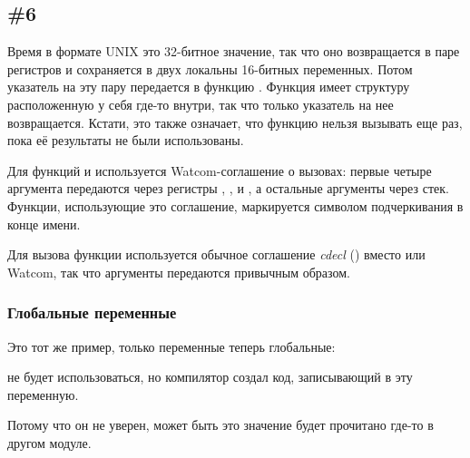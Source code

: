 \subsection{\Example{} \#6}





Время в формате UNIX это 32-битное значение, так что оно возвращается в паре регистров  и сохраняется
в двух локальны 16-битных переменных.
Потом указатель на эту пару передается в функцию
.
Функция  имеет структуру  расположенную у себя
где-то внутри, так что только указатель на нее возвращается. 
Кстати, это также означает, что функцию нельзя вызывать еще раз, пока её результаты не были использованы.

Для функций  и  используется
Watcom-соглашение о вызовах: первые четыре аргумента передаются через регистры
, ,  и , а остальные аргументы через стек.
Функции, использующие это соглашение, маркируется символом подчеркивания в конце имени.

Для вызова функции  используется обычное соглашение \emph{cdecl} () вместо 
 или Watcom, так что аргументы передаются привычным образом.

\subsubsection{Глобальные переменные}

Это тот же пример, только переменные теперь глобальные:





 не будет использоваться, но компилятор создал код, записывающий в эту переменную.

Потому что он не уверен, может быть это значение будет прочитано где-то в другом модуле.


